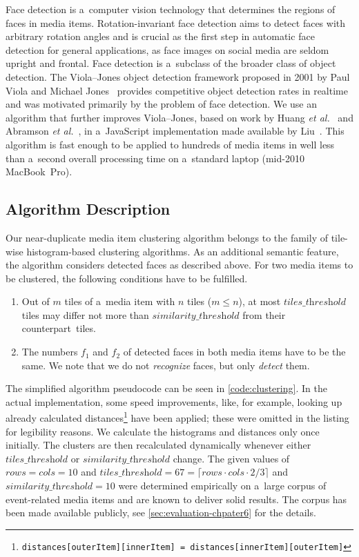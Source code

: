 Face detection is a~computer vision technology
that determines the regions of faces in media items.
Rotation-invariant face detection aims to detect faces with arbitrary
rotation angles and is crucial as the first step in automatic face detection
for general applications, as face images on social media are seldom upright and frontal.
Face detection is a~subclass of the broader class of object detection.
The Viola--Jones object detection framework proposed in 2001
by Paul Viola and Michael
Jones~\cite{viola2001objectdetection,viola2004facedetection}
provides competitive object detection rates in realtime
and was motivated primarily by the problem of face detection.
We use an algorithm that further improves Viola--Jones,
based on work by Huang \emph{et al.}~\cite{huang2007facedetection}
and Abramson \emph{et al.}~\cite{abramson2007yef},
in a~JavaScript implementation made available by Liu~\cite{liu2012facedetection}.
This algorithm is fast enough to be applied to hundreds of media items
in well less than a~second overall processing time on a~standard laptop
(mid-2010 MacBook~Pro).

\subsection{Algorithm Description}

Our near-duplicate media item clustering algorithm belongs to the family of
tile-wise histogram-based clustering algorithms.
As an additional semantic feature, the algorithm considers detected faces
as described above.
For two media items to be clustered,
the following conditions have to be fulfilled.

\begin{enumerate}
  \item Out of $m$ tiles of a~media item with $n$ tiles ($m \leq n$),
    at most $\textit{tiles\_threshold}$ tiles may differ not more than $\textit{similarity\_threshold}$
    from their counterpart~tiles.
  \item The numbers $f_1$ and $f_2$ of detected faces in both media items
    have to be the same.
    We note that we do not \emph{recognize} faces, but only \emph{detect} them.
\end{enumerate}

The simplified algorithm pseudocode can be seen in \autoref{code:clustering}.
In the actual implementation, some speed improvements,
like, for example, looking up already calculated
distances\footnote{\texttt{distances[outerItem][innerItem] =
distances[innerItem][outerItem]}}
have been applied;
these were omitted in the listing for legibility reasons.
We calculate the histograms and distances only once initially.
The clusters are then recalculated dynamically
whenever either $\textit{tiles\_threshold}$ or $\textit{similarity\_threshold}$ change.
The given values of $\textit{rows} = \textit{cols} = 10$ and
$\textit{tiles\_threshold} = 67 = \lceil \textit{rows} \cdot \textit{cols} \cdot 2/3 \rceil$
and $\textit{similarity\_threshold} = 10$ were determined empirically
on a~large corpus of event-related media items
and are known to deliver solid results.
The corpus has been made available publicly,
see \autoref{sec:evaluation-chpater6} for the details.

